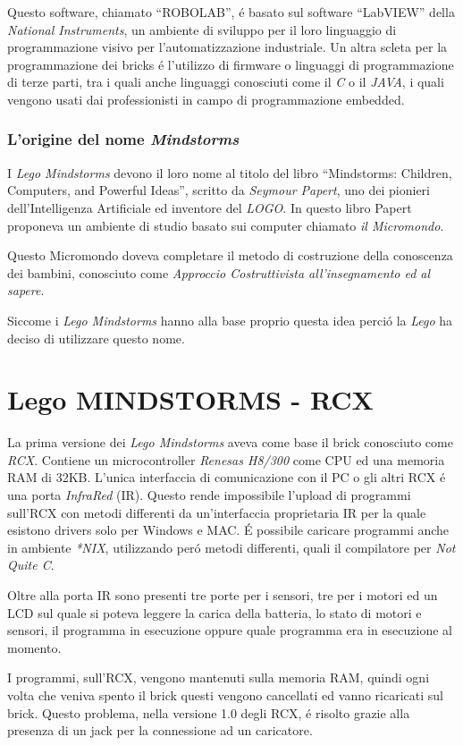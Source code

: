 Questo software, chiamato ``ROBOLAB'', \'e basato sul software ``LabVIEW''
della \emph{National Instruments}, un ambiente di sviluppo per il
loro linguaggio di programmazione visivo per l'automatizzazione
industriale. Un altra scleta per la programmazione dei bricks \'e
l'utilizzo di firmware o linguaggi di programmazione di terze parti, tra i
quali anche linguaggi conosciuti come il \emph{C} o il \emph{JAVA}, i quali
vengono usati dai professionisti in campo di programmazione embedded.

\subsubsection{L'origine del nome \emph{Mindstorms}}
I \emph{Lego Mindstorms} devono il loro nome al titolo del libro
``Mindstorms: Children, Computers, and Powerful Ideas'', scritto da \emph{Seymour
Papert}, uno dei pionieri dell'Intelligenza Artificiale ed inventore del
\emph{LOGO}. In questo libro Papert proponeva un ambiente di studio basato
sui computer chiamato \emph{il Micromondo}.

Questo Micromondo doveva completare il metodo di costruzione della
conoscenza dei bambini, conosciuto come \emph{Approccio Costruttivista
all'insegnamento ed al sapere}.

Siccome i \emph{Lego Mindstorms} hanno alla base proprio questa idea
perci\'o la \emph{Lego} ha deciso di utilizzare questo nome.

\section{Lego MINDSTORMS - RCX}
La prima versione dei \emph{Lego Mindstorms} aveva come base il brick
conosciuto come \emph{RCX}.
Contiene un microcontroller 
\emph{Renesas H8/300} come CPU ed una memoria RAM di 32KB. L'unica
interfaccia di comunicazione con il PC o gli altri RCX \'e una porta
\emph{InfraRed} (IR). Questo rende impossibile l'upload di programmi
sull'RCX con metodi differenti da un'interfaccia proprietaria IR per la
quale esistono drivers solo per Windows e MAC. \'E possibile caricare
programmi anche in ambiente \emph{*NIX}, utilizzando per\'o metodi
differenti, quali il compilatore per \emph{Not Quite C}.

Oltre alla porta IR sono presenti tre porte per i sensori, tre per i
motori ed un LCD sul quale si poteva leggere la carica della batteria, lo
stato di motori e sensori, il programma in esecuzione oppure quale
programma era in esecuzione al momento.

I programmi, sull'RCX, vengono mantenuti sulla memoria RAM, quindi ogni
volta che veniva spento il brick questi vengono cancellati ed vanno
ricaricati sul brick. Questo problema, nella versione 1.0 degli RCX, \'e
risolto grazie alla presenza di un jack per la connessione ad un
caricatore.


\cleardoublepage
